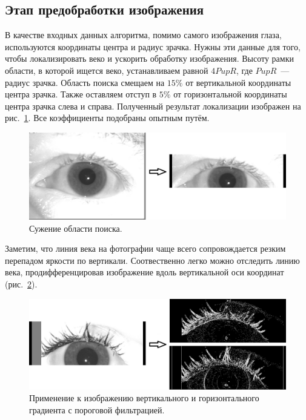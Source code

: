\documentclass[12pt,a4paper]{article} %
\begin{document}
\subsection{Этап предобработки изображения}

В качестве входных данных алгоритма, помимо самого изображения глаза, используются координаты центра и радиус зрачка. Нужны эти данные для того, чтобы локализировать веко и ускорить обработку изображения. Высоту рамки области, в которой ищется веко, устанавливаем равной $4 PupR$, где $PupR$~--- радиус зрачка. Область поиска смещаем на $15\%$ от вертикальной координаты центра зрачка. Также оставляем отступ в $5\%$ от горизонтальной координаты центра зрачка слева и справа. Полученный результат локализации изображен на рис.~\ref{fig:glaz6}. Все коэффициенты подобраны опытным путём.

\begin{figure}[h]
	
	\centering
	
	\includegraphics[width=0.8\linewidth]{glaz6.jpg}
	
	\caption{Сужение области поиска.}
	
	\label{fig:glaz6}
	
\end{figure}

Заметим, что линия века на фотографии чаще всего сопровождается резким перепадом яркости по вертикали. Соотвественно легко можно отследить линию века, продифференцировав изображение вдоль вертикальной оси координат (рис.~\ref{fig:glaz7}).

\begin{figure}[h]
	
	\centering
	
	\includegraphics[width=0.8\linewidth]{glaz7.jpg}
	
	\caption{Применение к изображению вертикального и горизонтального градиента с пороговой фильтрацией.}
	
	\label{fig:glaz7}
	
\end{figure}
\end{document}
